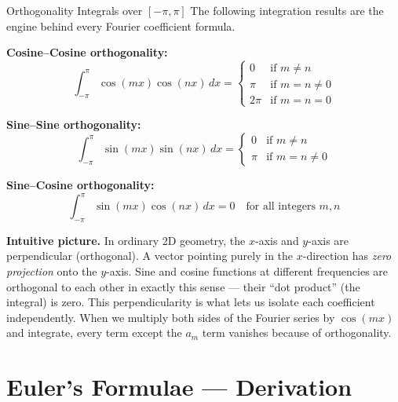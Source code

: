 \documentclass[12pt,a4paper]{article}
\begin{document}
\begin{infobox}{Orthogonality Integrals over $[-\pi, \pi]$}
The following integration results are the engine behind every Fourier coefficient formula.

\medskip

\textbf{Cosine--Cosine orthogonality:}
\[
\int_{-\pi}^{\pi}\cos(mx)\cos(nx)\,dx =
\begin{cases}
0 & \text{if } m \ne n \\
\pi & \text{if } m = n \ne 0 \\
2\pi & \text{if } m = n = 0
\end{cases}
\]

\textbf{Sine--Sine orthogonality:}
\[
\int_{-\pi}^{\pi}\sin(mx)\sin(nx)\,dx =
\begin{cases}
0 & \text{if } m \ne n \\
\pi & \text{if } m = n \ne 0
\end{cases}
\]

\textbf{Sine--Cosine orthogonality:}
\[
\int_{-\pi}^{\pi}\sin(mx)\cos(nx)\,dx = 0 \quad \text{for all integers } m, n
\]
\end{infobox}

\textbf{Intuitive picture.}
In ordinary 2D geometry, the $x$-axis and $y$-axis are perpendicular (orthogonal).
A vector pointing purely in the $x$-direction has \emph{zero projection} onto the $y$-axis.
Sine and cosine functions at different frequencies are orthogonal to each other in exactly this sense --- their ``dot product'' (the integral) is zero.
This perpendicularity is what lets us isolate each coefficient independently.
When we multiply both sides of the Fourier series by $\cos(mx)$ and integrate, every term except the $a_m$ term vanishes because of orthogonality.

\section{Euler's Formulae --- Derivation}
\end{document}
